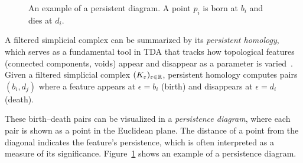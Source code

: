 \begin{figure}
    \centering
    \caption{An example of a persistent diagram. A point $p_i$ is born at $b_i$ and dies at $d_i$.}
    \label{fig:pd}
\end{figure}

A filtered simplicial complex can be summarized by its \emph{persistent homology},
which serves as a fundamental tool in TDA that tracks how topological features
(connected components, voids) appear and disappear as a parameter is
varied~\cite{edelsbrunner2010computational}. Given a filtered
simplicial complex $(K_\varepsilon)_{\varepsilon \in \mathbb{R}}$, persistent homology
computes pairs $(b_i, d_j)$ where a feature appears at
$\epsilon = b_i$ (birth) and disappears at $\epsilon = d_i$ (death).

These birth--death pairs can be visualized in a \emph{persistence diagram},
where each pair is shown as a point in the Euclidean plane. The distance of a
point from the diagonal indicates the feature's persistence, which is often
interpreted as a measure of its significance. Figure~\ref{fig:pd} shows an
example of a persistence diagram.

